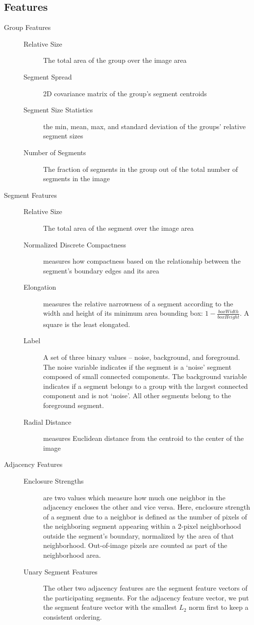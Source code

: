\subsection{Features}
\begin{description}
\item[Group Features] \hfill
	\begin{description}
	  \item[Relative Size] The total area of the group over the image area
	  \item[Segment Spread] 2D covariance matrix of the group's segment centroids
	  \item[Segment Size Statistics] the min, mean, max, and standard deviation of the groups' relative segment sizes
	  \item[Number of Segments] The fraction of segments in the group out of the total number of segments in the image
	\end{description}
\item[Segment Features] \hfill
	\begin{description}
	  \item[Relative Size] The total area of the segment over the image area
	  \item[Normalized Discrete Compactness] measures how compactness based on the relationship between the segment's boundary edges and its area ~\cite{NormalizedDiscreteCompactness}
	  \item[Elongation] measures the relative narrowness of a segment according to the width and height of its minimum area bounding box: $1-\frac{boxWidth}{boxHeight}$. A square is the least elongated.
	  \item[Label] A set of three binary values -- noise, background, and foreground. The noise variable indicates if the segment is a `noise' segment composed of small connected components. The background variable indicates if a segment belongs to a group with the largest connected component and is not `noise'. All other segments belong to the foreground segment.
	  \item[Radial Distance] measures Euclidean distance from the centroid to the center of the image
	\end{description}

\item[Adjacency Features] \hfill
	\begin{description}
	  \item[Enclosure Strengths] are two values which measure how much one neighbor in the adjacency encloses the other and vice versa. Here, enclosure strength of a segment due to a neighbor is defined as the number of pixels of the neighboring segment appearing within a 2-pixel neighborhood outside the segment's boundary, normalized by the area of that neighborhood. Out-of-image pixels are counted as part of the neighborhood area.
	  \item[Unary Segment Features] The other two adjacency features are the segment feature vectors of the participating segments. For the adjacency feature vector, we put the segment feature vector with the smallest $L_2$ norm first to keep a consistent ordering.
	\end{description}
\end{description}